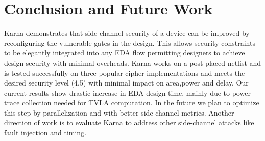 \section{Conclusion and Future Work}
\label{sec:conclusion}
{\sf Karna} demonstrates that side-channel security of a device can be improved by reconfiguring the vulnerable gates in the design. This allows security constraints to be elegantly integrated into any EDA flow permitting designers to achieve design security with minimal overheads. {\sf Karna} works on a post placed netlist and is tested successfully on three popular cipher implementations and meets the desired security level (4.5) with minimal impact on area,power and delay. Our current results show drastic increase in EDA design time, mainly due to power trace collection needed for TVLA computation. In the future we plan to optimize this step by parallelization and with better side-channel metrics. Another direction of work is to evaluate {\sf Karna} to address other side-channel attacks like fault injection and timing. 






